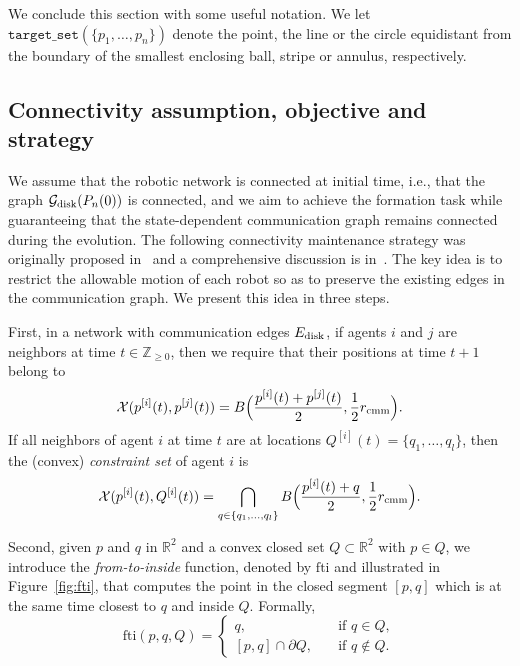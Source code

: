 \documentclass[onecolumn,journal,letterpaper]{IEEEtran}
\newcommand{\integernonnegative}{{\mathbb{Z}_{\geq0}}}
\newcommand{\naturalzero}{\mathbb{N}_0}
\renewcommand{\naturalzero}{\integernonnegative}
\newcommand{\real}{{\mathbb{R}}}
\newcommand{\subscr}[2]{{#1}_{\textup{#2}}}
\newcommand{\intersection}{\ensuremath{\operatorname{\cap}}}
\newcommand{\rcmm}{\subscr{r}{cmm}}
\newcommand{\GG}{\mathcal{G}}
\newcommand{\Bigcball}[2]{B\Big(#2,#1\Big)}
\newcommand{\XX}{\mathcal{X}}
\newcommand{\half}{\frac{1}{2}}
\newcommand{\fti}{\text{fti}}
\newcommand{\supind}[2]{{#1}^{[#2]}}
\begin{document}
We conclude this section with some useful notation.  We let
$\texttt{target\_set}(\{p_1,\dots,p_n\})$ denote the point, the line or the
circle equidistant from the boundary of the smallest enclosing ball, stripe
or annulus, respectively.


\subsection{Connectivity assumption, objective and strategy}
We assume that the robotic network is connected at initial time, i.e., that
the graph $\subscr{\GG}{disk}(P_n(0))$ is connected, and we aim to achieve
the formation task while guaranteeing that the state-dependent
communication graph remains connected during the evolution.  The following
connectivity maintenance strategy was originally proposed
in~\cite{HA-YO-IS-MY:99} and a comprehensive discussion is
in~\cite{FB-JC-SM:09}.  The key idea is to restrict the allowable motion of
each robot so as to preserve the existing edges in the communication graph.
We present this idea in three steps.

First, in a network with communication edges $\subscr{E}{disk}$, if agents
$i$ and $j$ are neighbors at time $t\in\naturalzero$, then we require that
their positions at time $t+1$ belong to
\begin{equation*}
  \XX(\supind{p}{i}(t), \supind{p}{j}(t)) =
  \Bigcball{\half\rcmm}{\frac{\supind{p}{i}(t)+\supind{p}{j}(t)}{2}}.
\end{equation*}
If all neighbors of agent $i$ at time $t$ are at locations
$\supind{Q}{i}(t) = \{q_1,\dots,q_l\}$, then the (convex) \emph{constraint
  set} of agent $i$ is
\begin{equation*}
    \XX(\supind{p}{i}(t), \supind{Q}{i}(t))
    = \bigcap_{q\in \{q_1,\dots,q_l\}}
    \Bigcball{\half\rcmm}{\frac{\supind{p}{i}(t)+q}{2}}.
\end{equation*}

Second, given $p$ and $q$ in $\real^2$ and a convex closed set $Q \subset
\real^2$ with $p \in Q$, we introduce the \emph{from-to-inside} function,
denoted by $\fti$ and illustrated in Figure~\ref{fig:fti}, that computes
the point in the closed segment $[p, q]$ which is at the same time closest
to $q$ and inside $Q$. Formally,
\begin{equation*}
    \fti(p, q,Q) =
    \begin{cases}
        q, &\text{if } q\in Q,\\
        [p,q] \intersection \partial Q, \quad&  \text{if } q\notin Q.
    \end{cases}
\end{equation*}
\end{document}
